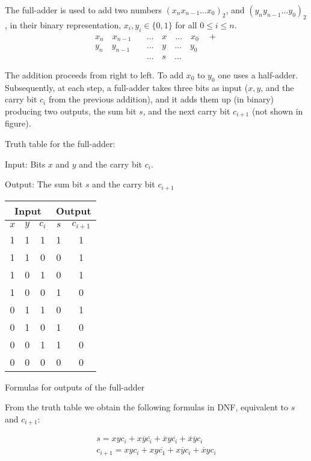 \documentclass{article}
\begin{document}
The full-adder is used to add two numbers $(x_nx_{n-1}\ldots x_0)_2$, and $(y_ny_{n-1}\ldots y_0)_2$, in their binary representation, $x_i, y_i \in \{0,1\}$ for all $0 \le i \le n$. 
\begin{align*}
x_n \quad x_{n-1} \quad &\ldots \quad x \quad \ldots \quad x_0 \quad + \\
y_n \quad y_{n-1} \quad &\ldots \quad y \quad \ldots \quad y_0 \\
&\ldots \quad s \quad \ldots
\end{align*}

The addition proceeds from right to left. To add $x_0$ to $y_0$ one uses a half-adder. Subsequently, at each step, a full-adder takes three bits as input ($x,y$, and the carry bit $c_i$ from the previous addition), and it adds them up (in binary) producing two outputs, the sum bit $s$, and the next carry bit $c_{i+1}$ (not shown in figure).

Truth table for the full-adder:

Input: Bits $x$ and $y$ and the carry bit $c_i$.

Output: The sum bit $s$ and the carry bit $c_{i+1}$


\begin{table}[h]
    \centering
    \begin{tabular}{|c|c|c|c|c|}
 \multicolumn{3}{c}{Input}& \multicolumn{2}{c}{Output}\\\hline
         $x$&  $y$&  $c_i$&  $s$& $c_{i+1}$\\\hline
         1&  1&  1&  1& 1\\
         1&  1&  0&  0& 1\\
         1&  0&  1&  0& 1\\
         1&  0&  0&  1& 0\\
         0&  1&  1&  0& 1\\
         0&  1&  0&  1& 0\\
         0&  0&  1&  1& 0\\
         0&  0&  0&  0& 0\\\hline
    \end{tabular}
\end{table}

Formulas for outputs of the full-adder

From the truth table we obtain the following formulas in DNF, equivalent to $s$ and $c_{i+1}$:

\begin{align*}
s = xyc_i + x\overline{y} \overline{c_i} + \overline{x} y\overline{c_i} + \overline{x} \overline{y} c_i \\
c_{i+1} = xyc_i + xy\overline{c_1} + x\overline{y} c_i + \overline{x} yc_i
\end{align*}
\end{document}
